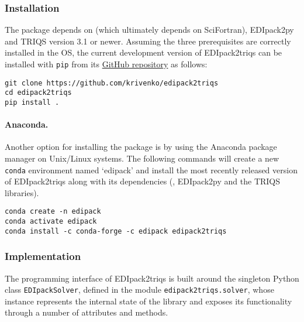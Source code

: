\documentclass[edipack_sp.tex]{subfiles}
\begin{document}
\subsubsection{Installation}\label{sSecInteropTRIQSInstallation}
The package depends on \NAME (which ultimately depends on SciFortran), EDIpack2py
and TRIQS version 3.1 or newer. Assuming the three prerequisites are correctly 
installed in the OS, the current development version of EDIpack2triqs can be 
installed with {\tt pip} from its 
\href{https://github.com/krivenko/edipack2triqs}{GitHub repository} as follows:

\begin{lstlisting}[style=mybash]
git clone https://github.com/krivenko/edipack2triqs
cd edipack2triqs
pip install .
\end{lstlisting}

\paragraph{Anaconda.}
Another option for installing the package is by using the Anaconda package 
manager on Unix/Linux systems.
The following commands will create a new {\tt conda} environment named 
`edipack' and install the most recently released version of EDIpack2triqs along 
with its dependencies (\NAME, EDIpack2py and the TRIQS libraries).

\begin{lstlisting}[style=mybash]
conda create -n edipack
conda activate edipack
conda install -c conda-forge -c edipack edipack2triqs
\end{lstlisting}

\subsubsection{Implementation}\label{sSecInteropTRIQSImplementation}
The programming interface of EDIpack2triqs is built around the  
singleton Python class {\tt EDIpackSolver}, defined in the module
{\tt edipack2triqs.solver}, whose instance represents the internal state of 
the \NAME library and exposes its functionality through a number of 
attributes and methods.
\end{document}
